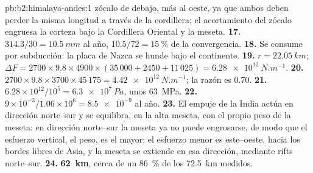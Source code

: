 \begin{solution}{pb:b2:himalaya-andes:1}
zócalo de debajo, más al oeste, ya que ambos deben perder la misma longitud a través de la cordillera; el acortamiento
del zócalo engruesa la corteza bajo la Cordillera Oriental y la meseta.
\textbf{17.} $314.3/30 = \qty{10.5}{mm}$ al año, $10.5/72 = \qty{15}{\percent}$ de la
convergencia.
\textbf{18.} Se consume por subducción: la placa de Nazca se hunde bajo el continente.
\textbf{19.} $r = \qty{22.05}{km}$; $\Delta F = 2700\times9.8\times4900\times(35\,000 + 2450
+ 11\,025) = \qty{6.28e12}{N.m^{-1}}$.
\textbf{20.} $2700\times9.8\times3700\times45\,175 = \qty{4.42e12}{N.m^{-1}}$; la razón es
0.70.
\textbf{21.} $6.28\times10^{12}/10^{5} = \qty{6.3e7}{Pa}$, unos \qty{63}{MPa}.
\textbf{22.} $9\times10^{-3}/1.06\times10^{6} = \num{8.5e-9}$ al año.
\textbf{23.} El empuje de la India actúa en dirección norte--sur y se equilibra, en la alta meseta, con el
propio peso de la meseta: en dirección norte--sur la meseta ya no puede engrosarse, de modo que el esfuerzo vertical,
el peso, es el mayor; el esfuerzo menor es este--oeste, hacia los bordes libres de Asia,
y la meseta se extiende en esa dirección, mediante rifts norte--sur.
\textbf{24.} \textbf{\qty[text-series-to-math=true]{62}{km}}, cerca de un \qty{86}{\percent} de los
\qty{72.5}{km} medidos.
\end{solution}
